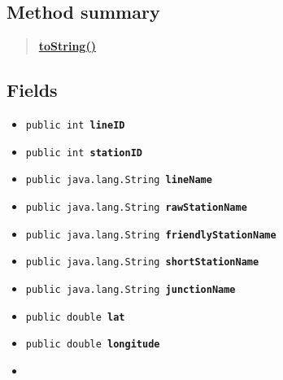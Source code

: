 \documentclass[11pt,a4paper]{report}
\begin{document}
{{{{{{{{{{{{{{{{{{\subsection{Method summary}{
\begin{verse}
\hyperlink{Models.TransportStation.toString()}{{\bf toString()}} \\
\end{verse}
}
\subsection{Fields}{
\begin{itemize}
\item{
\label{Models.TransportStation.lineID}\hypertarget{Models.TransportStation.lineID}{\texttt{public int\ {\bf  lineID}}
}
}
\item{
\label{Models.TransportStation.stationID}\hypertarget{Models.TransportStation.stationID}{\texttt{public int\ {\bf  stationID}}
}
}
\item{
\label{Models.TransportStation.lineName}\hypertarget{Models.TransportStation.lineName}{\texttt{public java.lang.String\ {\bf  lineName}}
}
}
\item{
\label{Models.TransportStation.rawStationName}\hypertarget{Models.TransportStation.rawStationName}{\texttt{public java.lang.String\ {\bf  rawStationName}}
}
}
\item{
\label{Models.TransportStation.friendlyStationName}\hypertarget{Models.TransportStation.friendlyStationName}{\texttt{public java.lang.String\ {\bf  friendlyStationName}}
}
}
\item{
\label{Models.TransportStation.shortStationName}\hypertarget{Models.TransportStation.shortStationName}{\texttt{public java.lang.String\ {\bf  shortStationName}}
}
}
\item{
\label{Models.TransportStation.junctionName}\hypertarget{Models.TransportStation.junctionName}{\texttt{public java.lang.String\ {\bf  junctionName}}
}
}
\item{
\label{Models.TransportStation.lat}\hypertarget{Models.TransportStation.lat}{\texttt{public double\ {\bf  lat}}
}
}
\item{
\label{Models.TransportStation.longitude}\hypertarget{Models.TransportStation.longitude}{\texttt{public double\ {\bf  longitude}}
}
}
\item{
}
\end{itemize}}}}}}}}}}}}}}}}}}}}
\end{document}
